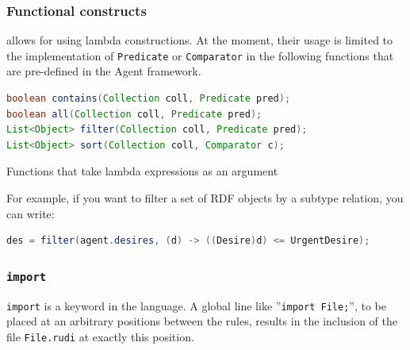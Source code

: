 \subsubsection{Functional constructs}

\vonda allows for using lambda constructions. At the moment, their usage is limited to the implementation of \texttt{Predicate} or \texttt{Comparator} in the following functions that are pre-defined in the Agent framework.

\begin{table}[htbp]
  \centering
  \begin{small}
\begin{lstlisting}[language=Java]
boolean contains(Collection coll, Predicate pred);
boolean all(Collection coll, Predicate pred);
List<Object> filter(Collection coll, Predicate pred);
List<Object> sort(Collection coll, Comparator c);
\end{lstlisting}
  \end{small}

  \caption{Functions that take lambda expressions as an argument}
  \label{tab:lambda-functions}
\end{table}

For example, if you want to filter a set of RDF objects by a subtype relation, you can write:

\begin{lstlisting}[language=Java]
des = filter(agent.desires, (d) -> ((Desire)d) <= UrgentDesire);
\end{lstlisting}

\subsubsection{\texttt{import}}

%
\texttt{import} is a keyword in the \vonda language. A global line like ''\texttt{import File;}'', to be placed at an arbitrary positions between the rules, results in the inclusion of the file \texttt{File.rudi} at exactly this position.

